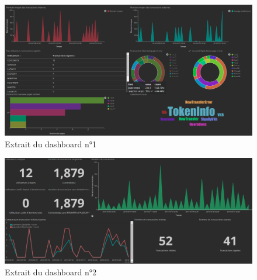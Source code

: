 \begin{figure}
	\centering
    \includegraphics[scale=0.5]{images/travailNeuflizeOBC/dashboard/kibanaGeneral_01.png}
    \caption{Extrait du dashboard n°1}
\end{figure}

\begin{figure}
	\centering
    \includegraphics[scale=0.5]{images/travailNeuflizeOBC/dashboard/kibanaGeneral_02.png}
    \caption{Extrait du dashboard n°2}
\end{figure}